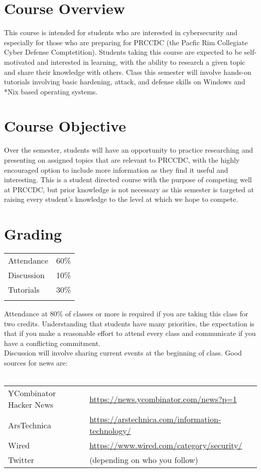 \documentclass{article}
\begin{document}
\section*{Course Overview}
This course is intended for students who are interested in cybersecurity and especially for those who are preparing for PRCCDC (the Pacfic Rim Collegiate Cyber Defense Comptetition). Students taking this course are expected to be self-motivated and interested in learning, with the ability to research a given topic and share their knowledge with others. Class this semester will involve hands-on tutorials involving basic hardening, attack, and defense skills on Windows and *Nix based operating systems.

\section*{Course Objective}
Over the semester, students will have an opportunity to practice researching and presenting on assigned topics that are relevant to PRCCDC, with the highly encouraged option to include more information as they find it useful and interesting. This is a student directed course with the purpose of competing well at PRCCDC, but prior knowledge is not necessary as this semester is targeted at raising every student's knowledge to the level at which we hope to compete.

\section*{Grading}

\begin{tabular}{l  l}
Attendance & 60\% \\
Discussion & 10\% \\
Tutorials & 30\% \\\\
\end{tabular}

\noindent Attendance at 80\% of classes or more is required if you are taking this class for two credits. Understanding that students have many priorities, the expectation is that if you make a reasonable effort to attend every class and communicate if you have a conflicting commitment.\\

\noindent Discussion will involve sharing current events at the beginning of class. Good sources for news are:\\\\
\begin{tabular}{l   l}
YCombinator Hacker News & \url{https://news.ycombinator.com/news?p=1} \\
ArsTechnica & \url{https://arstechnica.com/information-technology/} \\
Wired & \url{https://www.wired.com/category/security/} \\
Twitter & (depending on who you follow)
\end{tabular}\\
\end{document}
